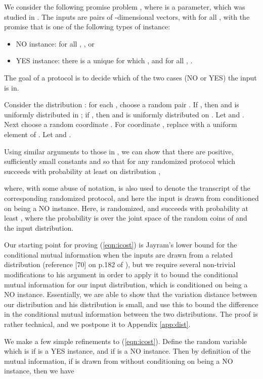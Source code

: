 \documentclass[twoside,leqno,twocolumn]{article}
\begin{document}
We consider the following promise problem 
, where  is a parameter, 
which was studied in \cite{ss02,BJKS04}. The
inputs are pairs  of -dimensional vectors, with
 for all , with the promise that 
 is one of the following types of instance:
\begin{itemize}
\item NO instance: for all , , or
\item YES instance: there is a unique  for which
  , and for all , .
\end{itemize}
The goal of a protocol is to decide which of the two cases (NO or YES) the input
is in. 


Consider the distribution : for each , choose a random pair . If , then  and 
 is uniformly distributed in ; if , then 
and  is uniformly distributed on . 
Let  and . 
Next choose a random coordinate . 
For coordinate , replace  with a uniform element of 
.  Let  and .

Using similar arguments to those in \cite{BJKS04}, 
we can show that there are positive, sufficiently small 
constants  and  so that
for any randomized protocol  which succeeds with probability at
least  on distribution ,

where, with some abuse of notation, 
 is also used to denote the transcript of the corresponding randomized protocol,
and here the input  is drawn
from  conditioned on  being a NO instance. 
Here,  is randomized, and succeeds with probability at least ,
where the probability is over the joint space of the random coins of
 and the input distribution.

Our starting point for proving (\ref{eqn:icost}) is 
Jayram's lower bound for the conditional mutual information when the inputs
are drawn from a related distribution 
(reference [70] on p.182 of \cite{BarYossefThesis}),
but we require several non-trivial modifications to his argument 
in order to apply it to bound the conditional mutual information for our input distribution, 
which is  conditioned
on  being a NO instance. Essentially, we are able to show that the variation
distance between our distribution and his distribution is small, and use this to
bound the difference in the conditional mutual information between the two distributions.
The proof is rather technical, and we postpone it to Appendix \ref{app:dist}. 

We make a few simple refinements to (\ref{eqn:icost}).  Define the random variable
 which is  if  is a YES instance, and  if  is a
NO instance. Then by definition of the mutual information, 
if  is drawn from
 without conditioning on  being a NO instance, then we have
\end{document}

